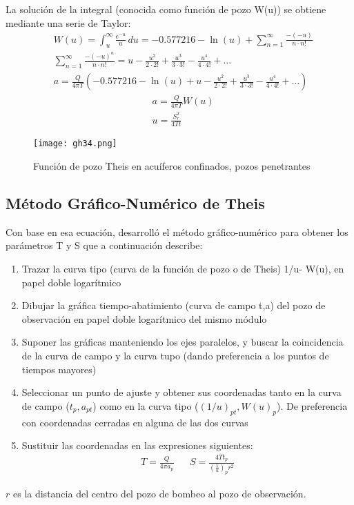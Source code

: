 La solución de la integral (conocida como función de pozo W(u)) se obtiene mediante una serie de Taylor:
\begin{align*}
    &W(u) = \int_{u}^{\infty} \frac{e^{ - u}}{u}\, du = - 0.577216 - \ln{(u)} + \sum_{n = 1}^{\infty} \frac{-(-u)}{n\cdot n!}\\
    &\sum_{n = 1}^{\infty} \frac{ -( - u)^{n} }{n\cdot n!} = u - \frac{u^2}{2\cdot 2!} + \frac{u^3}{3\cdot 3!} - \frac{u^4}{4\cdot 4!} + \dots \\ 
    &a = \frac{Q}{4\pi T}\left( - 0.577216 - \ln{(u)} + u - \frac{u^2}{2\cdot 2!} + \frac{u^3}{3\cdot 3!} - \frac{u^4}{4\cdot 4!} + \dots \right)
\end{align*}
\begin{align}
    &a = \frac{Q}{4\pi T} W(u)\\ 
    &u = \frac{S_r^2}{4Tt}
\end{align}
\begin{figure}[h!]
\centering
  \texttt{[image: gh34.png]}
  \caption{Función de pozo Theis en acuíferos confinados, pozos penetrantes}
  \label{gh34png}
\end{figure}
\subsection{Método Gráfico-Numérico de Theis}
Con base en esa ecuación, desarrolló el método gráfico-numérico para obtener los parámetros T y S que a continuación describe:

\begin{enumerate}
    \item Trazar la curva tipo (curva de la función de pozo o de Theis) 1/u- W(u), en papel doble logarítmico
    \item Dibujar la gráfica tiempo-abatimiento (curva de campo t,a) del pozo de observación en papel doble logarítmico del mismo módulo
    \item Suponer las gráficas manteniendo los ejes paralelos, y buscar la coincidencia de la curva de campo y la curva tupo (dando preferencia a los puntos de tiempos mayores)
    \item Seleccionar un punto de ajuste y obtener sus coordenadas tanto en la curva de campo ($t_p,a_{pt}$) como en la curva tipo ($(1/u)_{pt}, W(u)_p$). De preferencia con coordenadas cerradas en alguna de las dos curvas
    \item Sustituir las coordenadas en las expresiones siguientes:
    \begin{align*}
        T = \frac{Q}{4\pi a_p}&& S = \frac{4Tt_p}{\left(\frac{1}{u}\right)_p r^2}
    \end{align*}
\end{enumerate}
$r$ es la distancia del centro del pozo de bombeo al pozo de observación.

